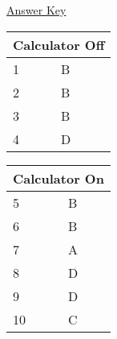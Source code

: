 \documentclass[10pt,twoside]{article}
\begin{document}
\clearpage 
\calconfalse 
\calcofffalse 
\nocontinuetrue 
\vspace*{-10mm} 
\begin{center} 
\underline{{\LARGE Answer Key}} 
\end{center} 
\begin{multicols}{2} 
\begin{center} 
\begin{tabularx}{0.6\columnwidth}{p{1cm}X} 
\multicolumn{2}{l}{Calculator Off} \\ 
\toprule 
1 & B \\ 
2 & B \\ 
3 & B \\ 
4 & D \\ 
\bottomrule 
\end{tabularx} 
\end{center} 
\vfill
\columnbreak
\begin{center} 
\begin{tabularx}{0.6\columnwidth}{p{1cm}X} 
\multicolumn{2}{l}{Calculator On} \\ 
\toprule 
5 & B \\ 
6 & B \\ 
7 & A \\ 
8 & D \\ 
9 & D \\ 
10 & C \\ 
\bottomrule 
\end{tabularx} 
\end{center} 
\end{multicols} 
\end{document}
